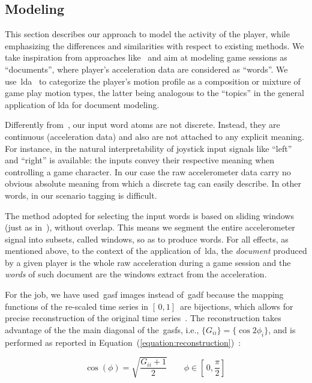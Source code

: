 \subsection{Modeling}
This section describes our approach to model the activity of the player, while emphasizing the differences and similarities with respect to existing methods. We take inspiration from approaches like~\cite{smith_mining_2016, wang_encoding_2015, wang_imaging_2015} and aim at modeling game sessions as ``documents'', where player's acceleration data are considered as ``words''. We use~\gls{lda}~\cite{blei_latent_2003} to categorize the player's motion profile as a composition or mixture of game play motion types, the latter being analogous to the ``topics'' in the general application of \gls{lda} for document modeling.

Differently from~\cite{smith_mining_2016}, our input word atoms are not discrete. Instead, they are continuous (acceleration data) and also are not attached to any explicit meaning. For instance, in \cite{smith_mining_2016} the natural interpretability of joystick input signals like ``left'' and ``right'' is available: the inputs convey their respective meaning when controlling a game character. In our case the raw accelerometer data carry no obvious absolute meaning from which a discrete tag can easily describe. In other words, in our scenario tagging is difficult.

The method adopted for selecting the input words is based on sliding windows (just as in~\cite{smith_mining_2016}), without overlap. This means we segment the entire accelerometer signal into subsets, called windows, so as to produce words. For all effects, as mentioned above, to the context of the application of~\gls{lda}, the \textit{document} produced by a given player is the whole raw acceleration during a game session and the \textit{words} of such document are the windows extract from the acceleration.

For the job, we have used~\gls{gasf} images instead of~\gls{gadf} because the mapping functions of the re-scaled time series in $[\,0,1]\,$ are bijections, which allows for precise reconstruction of the original time series~\citep{wang_imaging_2015}. The reconstruction takes advantage of the the main diagonal of the~\gls{gasf}s, i.e., $\{G_{ii}\} = \{\cos{2\phi_{i}}\}$, and is performed as reported in Equation~(\ref{equation:reconstruction})~\cite{wang_imaging_2015}:

\begin{equation}\label{equation:reconstruction}
    \cos(\phi)=\sqrt{\frac{G_{ii}+1}{2}} \qquad \phi \in [\,0,\frac{\pi}{2}]\,
\end{equation}

